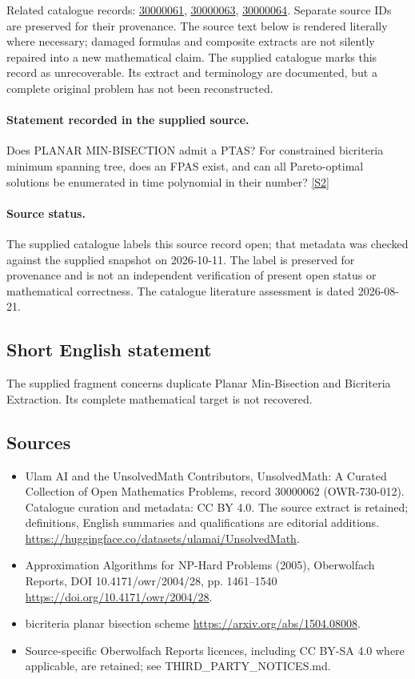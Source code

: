 \documentclass[11pt]{article}
\newcommand{\sref}[2]{\hyperlink{source:#1:#2}{[S#2]}}
\begin{document}
Related catalogue records: \href{https://mehmetmars7.github.io/Erdosproblems-llm-hunter/problem.html?type=open_problems&id=30000061}{30000061}, \href{https://mehmetmars7.github.io/Erdosproblems-llm-hunter/problem.html?type=open_problems&id=30000063}{30000063}, \href{https://mehmetmars7.github.io/Erdosproblems-llm-hunter/problem.html?type=open_problems&id=30000064}{30000064}. Separate source IDs are preserved for their provenance.
The source text below is rendered literally where necessary; damaged formulas and composite extracts are not silently repaired into a new mathematical claim.
The supplied catalogue marks this record as unrecoverable. Its extract and terminology are documented, but a complete original problem has not been reconstructed.
\paragraph{Statement recorded in the supplied source.}
Does PLANAR MIN-BISECTION admit a PTAS? For constrained bicriteria minimum spanning tree, does an FPAS exist, and can all Pareto-optimal solutions be enumerated in time polynomial in their number? \sref{30000062}{2}
\paragraph{Source status.}
The supplied catalogue labels this source record open; that metadata was checked against the supplied snapshot on 2026-10-11. The label is preserved for provenance and is not an independent verification of present open status or mathematical correctness. The catalogue literature assessment is dated 2026-08-21.
\subsection{Short English statement}
The supplied fragment concerns duplicate Planar Min-Bisection and Bicriteria Extraction. Its complete mathematical target is not recovered.
\subsection{Sources}
\begin{itemize}
\item[\hypertarget{source:30000062:1}{S1}] Ulam AI and the UnsolvedMath Contributors, UnsolvedMath: A Curated Collection of Open Mathematics Problems, record 30000062 (OWR-730-012). Catalogue curation and metadata: CC BY 4.0. The source extract is retained; definitions, English summaries and qualifications are editorial additions.
\url{https://huggingface.co/datasets/ulamai/UnsolvedMath}.
\item[\hypertarget{source:30000062:2}{S2}] Approximation Algorithms for NP-Hard Problems (2005), Oberwolfach Reports, DOI 10.4171/owr/2004/28, pp. 1461--1540
\url{https://doi.org/10.4171/owr/2004/28}.
\item[\hypertarget{source:30000062:3}{S3}] bicriteria planar bisection scheme
\url{https://arxiv.org/abs/1504.08008}.
\item Source-specific Oberwolfach Reports licences, including CC BY-SA 4.0 where applicable, are retained; see THIRD\_PARTY\_NOTICES.md.
\end{itemize}
\end{document}
